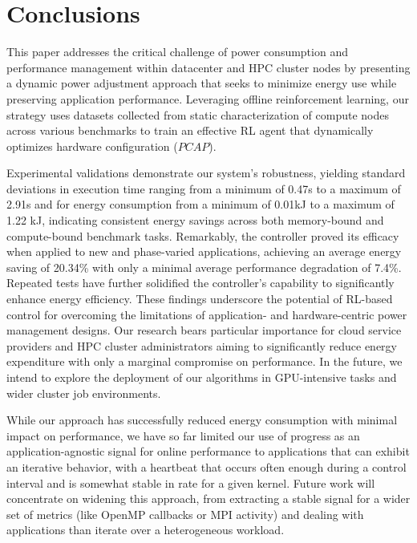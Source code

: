 \section{Conclusions}\label{ch4:sec:Conclusion}
This paper addresses the critical challenge of power consumption and performance management within datacenter and HPC cluster nodes by presenting a dynamic power adjustment approach that seeks to minimize energy use while preserving application performance. Leveraging offline reinforcement learning, our strategy uses datasets collected from static characterization of compute nodes across various benchmarks to train an effective RL agent that dynamically optimizes hardware configuration ($PCAP$).

Experimental validations demonstrate our system's robustness, yielding standard deviations in execution time ranging from a minimum of 0.47\unit{s} to a maximum of 2.91\unit{s} and for energy consumption from a minimum of 0.01\unit{kJ} to a maximum of 1.22 \unit{kJ}, indicating consistent energy savings across both memory-bound and compute-bound benchmark tasks.
Remarkably, the controller proved its efficacy when applied to new and phase-varied applications, achieving an average energy saving of 20.34\% with only a minimal average performance degradation of 7.4\%. Repeated tests have further solidified the controller's capability to significantly enhance energy efficiency. These findings underscore the potential of RL-based control for overcoming the limitations of application- and hardware-centric power management designs. Our research bears particular importance for cloud service providers and HPC cluster administrators aiming to significantly reduce energy expenditure with only a marginal compromise on performance. In the future, we intend to explore the deployment of our algorithms in GPU-intensive tasks and wider cluster job environments. 

While our approach has successfully reduced energy consumption with minimal impact on performance, we have so far limited our use of progress as an application-agnostic signal for online performance to applications that can exhibit an iterative behavior, with a heartbeat that occurs often enough during a control interval and is somewhat stable in rate for a given kernel. Future work will concentrate on widening this approach, from extracting a stable signal for a wider set of metrics (like OpenMP callbacks or MPI activity) and dealing with applications than iterate over a heterogeneous workload. 

